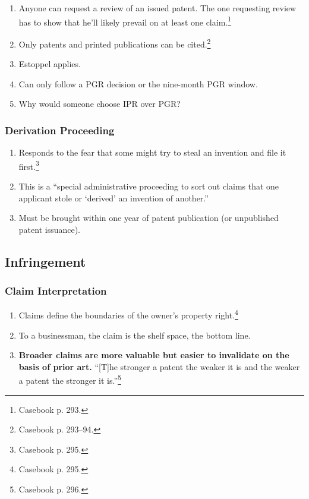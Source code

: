 \begin{enumerate}
    \item Anyone can request a review of an issued patent. The one requesting 
    review has to show that he'll likely prevail on at least one 
    claim.\footnote{Casebook p. 293.}
    \item Only patents and printed publications can be cited.\footnote{Casebook 
    p. 293--94.}
    \item Estoppel applies.
    \item Can only follow a PGR decision or the nine-month PGR window.
    \item Why would someone choose IPR over PGR?
\end{enumerate}

\subsubsection{Derivation Proceeding}

\begin{enumerate}
    \item Responds to the fear that some might try to steal an invention and 
    file it first.\footnote{Casebook p. 295.}
    \item This is a ``special administrative proceeding to sort out claims that 
    one applicant stole or `derived' an invention of another.''
    \item Must be brought within one year of patent publication (or unpublished 
    patent issuance).
\end{enumerate}

\subsection{Infringement}

\subsubsection{Claim Interpretation}

\begin{enumerate}
    \item Claims define the boundaries of the owner's property 
    right.\footnote{Casebook p. 295.}
    \item To a businessman, the claim is the shelf space, the bottom line.
    \item \textbf{Broader claims are more valuable but easier to invalidate on 
    the basis of prior art.} ``[T]he stronger a patent the weaker it is and the 
    weaker a patent the stronger it is.''\footnote{Casebook p. 296.}
\end{enumerate}

